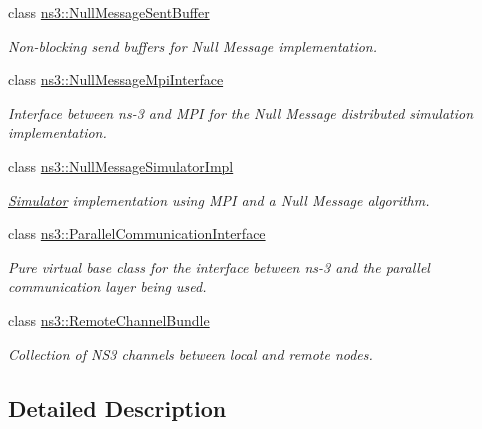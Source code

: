 \begin{DoxyCompactItemize}
class \hyperlink{classns3_1_1NullMessageSentBuffer}{ns3\+::\+Null\+Message\+Sent\+Buffer}
\begin{DoxyCompactList}\small\item\em Non-\/blocking send buffers for Null Message implementation. \end{DoxyCompactList}\item 
class \hyperlink{classns3_1_1NullMessageMpiInterface}{ns3\+::\+Null\+Message\+Mpi\+Interface}
\begin{DoxyCompactList}\small\item\em Interface between ns-\/3 and M\+PI for the Null Message distributed simulation implementation. \end{DoxyCompactList}\item 
class \hyperlink{classns3_1_1NullMessageSimulatorImpl}{ns3\+::\+Null\+Message\+Simulator\+Impl}
\begin{DoxyCompactList}\small\item\em \hyperlink{classns3_1_1Simulator}{Simulator} implementation using M\+PI and a Null Message algorithm. \end{DoxyCompactList}\item 
class \hyperlink{classns3_1_1ParallelCommunicationInterface}{ns3\+::\+Parallel\+Communication\+Interface}
\begin{DoxyCompactList}\small\item\em Pure virtual base class for the interface between ns-\/3 and the parallel communication layer being used. \end{DoxyCompactList}\item 
class \hyperlink{classns3_1_1RemoteChannelBundle}{ns3\+::\+Remote\+Channel\+Bundle}
\begin{DoxyCompactList}\small\item\em Collection of N\+S3 channels between local and remote nodes. \end{DoxyCompactList}\end{DoxyCompactItemize}


\subsection{Detailed Description}
